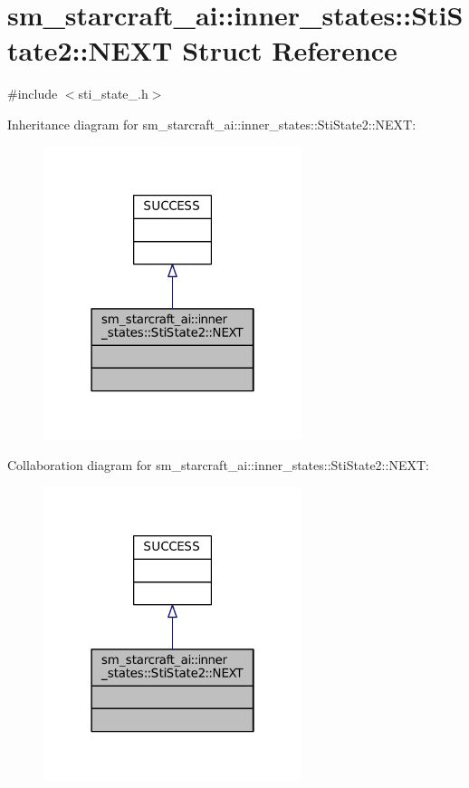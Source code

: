 \hypertarget{structsm__starcraft__ai_1_1inner__states_1_1StiState2_1_1NEXT}{}\section{sm\+\_\+starcraft\+\_\+ai\+:\+:inner\+\_\+states\+:\+:Sti\+State2\+:\+:N\+E\+XT Struct Reference}
\label{structsm__starcraft__ai_1_1inner__states_1_1StiState2_1_1NEXT}


{\ttfamily \#include $<$sti\+\_\+state\+\_.\+h$>$}



Inheritance diagram for sm\+\_\+starcraft\+\_\+ai\+:\+:inner\+\_\+states\+:\+:Sti\+State2\+:\+:N\+E\+XT\+:
\nopagebreak
\begin{figure}[H]
\begin{center}
\leavevmode
\includegraphics[width=214pt]{structsm__starcraft__ai_1_1inner__states_1_1StiState2_1_1NEXT__inherit__graph}
\end{center}
\end{figure}


Collaboration diagram for sm\+\_\+starcraft\+\_\+ai\+:\+:inner\+\_\+states\+:\+:Sti\+State2\+:\+:N\+E\+XT\+:
\nopagebreak
\begin{figure}[H]
\begin{center}
\leavevmode
\includegraphics[width=214pt]{structsm__starcraft__ai_1_1inner__states_1_1StiState2_1_1NEXT__coll__graph}
\end{center}
\end{figure}


